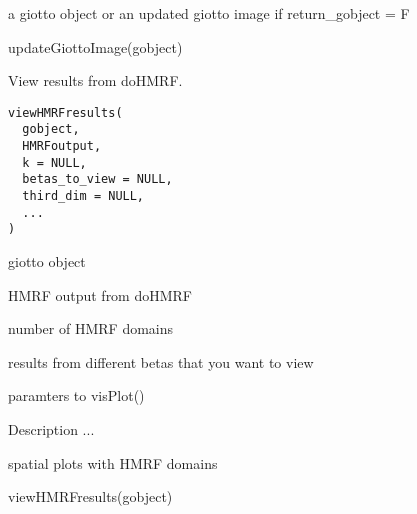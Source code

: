 \documentclass[a4paper]{book}
\begin{document}
%
\begin{Value}
a giotto object or an updated giotto image if return\_gobject = F
\end{Value}
%
\begin{Examples}
\begin{ExampleCode}
    updateGiottoImage(gobject)
\end{ExampleCode}
\end{Examples}
%
\begin{Description}\relax
View results from doHMRF.
\end{Description}
%
\begin{Usage}
\begin{verbatim}
viewHMRFresults(
  gobject,
  HMRFoutput,
  k = NULL,
  betas_to_view = NULL,
  third_dim = NULL,
  ...
)
\end{verbatim}
\end{Usage}
%
\begin{Arguments}
\begin{ldescription}
\item[\code{gobject}] giotto object

\item[\code{HMRFoutput}] HMRF output from doHMRF

\item[\code{k}] number of HMRF domains

\item[\code{betas\_to\_view}] results from different betas that you want to view

\item[\code{...}] paramters to visPlot()
\end{ldescription}
\end{Arguments}
%
\begin{Details}\relax
Description ...
\end{Details}
%
\begin{Value}
spatial plots with HMRF domains
\end{Value}
%
\begin{SeeAlso}\relax
{}
\end{SeeAlso}
%
\begin{Examples}
\begin{ExampleCode}
    viewHMRFresults(gobject)
\end{ExampleCode}
\end{Examples}
\end{document}
